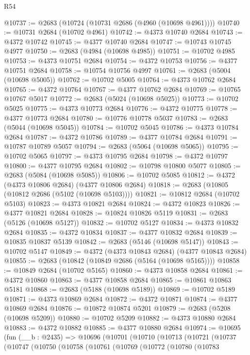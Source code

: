 \begin{lexlean}{R54}
\begin{coremodule}
@10737 := @2683 (@10724 (@10731 @2686 (@4960 (@10698 @4961))))
@10740 := @10731 @2684 (@10702 @4961)
@10742 := @4373 @10740 @2684
@10743 := @4372 @10742
@10745 := @4377 @10740 @2684
@10747 := @10743 @10745 @4977
@10750 := @2683 (@4984 (@10698 @4985))
@10751 := @10702 @4985
@10753 := @4373 @10751 @2684
@10754 := @4372 @10753
@10756 := @4377 @10751 @2684
@10758 := @10754 @10756 @4997
@10761 := @2683 (@5004 (@10698 @5005))
@10762 := @10702 @5005
@10764 := @4373 @10762 @2684
@10765 := @4372 @10764
@10767 := @4377 @10762 @2684
@10769 := @10765 @10767 @5017
@10772 := @2683 (@5024 (@10698 @5025))
@10773 := @10702 @5025
@10775 := @4373 @10773 @2684
@10776 := @4372 @10775
@10778 := @4377 @10773 @2684
@10780 := @10776 @10778 @5037
@10783 := @2683 (@5044 (@10698 @5045))
@10784 := @10702 @5045
@10786 := @4373 @10784 @2684
@10787 := @4372 @10786
@10789 := @4377 @10784 @2684
@10791 := @10787 @10789 @5057
@10794 := @2683 (@5064 (@10698 @5065))
@10795 := @10702 @5065
@10797 := @4373 @10795 @2684
@10798 := @4372 @10797
@10800 := @4377 @10795 @2684
@10802 := @10798 @10800 @5077
@10805 := @2683 (@5084 (@10698 @5085))
@10806 := @10702 @5085
@10812 := @4372 (@4373 @10806 @2684) (@4377 @10806 @2684)
@10818 := @2683 (@10805 (@10812 @2686 (@5102 (@10698 @5103))))
@10821 := @10812 @2684 (@10702 @5103)
@10823 := @4373 @10821 @2684
@10824 := @4372 @10823
@10826 := @4377 @10821 @2684
@10828 := @10824 @10826 @5119
@10831 := @2683 (@5126 (@10698 @5127))
@10832 := @10702 @5127
@10834 := @4373 @10832 @2684
@10835 := @4372 @10834
@10837 := @4377 @10832 @2684
@10839 := @10835 @10837 @5139
@10842 := @2683 (@5146 (@10698 @5147))
@10843 := @10702 @5147
@10849 := @4372 (@4373 @10843 @2684) (@4377 @10843 @2684)
@10855 := @2683 (@10842 (@10849 @2686 (@5164 (@10698 @5165))))
@10858 := @10849 @2684 (@10702 @5165)
@10860 := @4373 @10858 @2684
@10861 := @4372 @10860
@10863 := @4377 @10858 @2684
@10865 := @10861 @10863 @5181
@10868 := @2683 (@5188 (@10698 @5189))
@10869 := @10702 @5189
@10871 := @4373 @10869 @2684
@10872 := @4372 @10871
@10874 := @4377 @10869 @2684
@10876 := @10872 @10874 @5201
@10879 := @2683 (@5208 (@10698 @5209))
@10880 := @10702 @5209
@10882 := @4373 @10880 @2684
@10883 := @4372 @10882
@10885 := @4377 @10880 @2684
@10974 := @10695
    (fun (__b : @2435) =>
    @10696
      (@10701
        (@10710
          (@10713
            (@10721
              (@10737
                (@10747
                  (@10750
                    (@10758
                      (@10761
                        (@10769
                          (@10772
                            (@10780
                              (@10783

\end{coremodule}
\end{lexlean}
